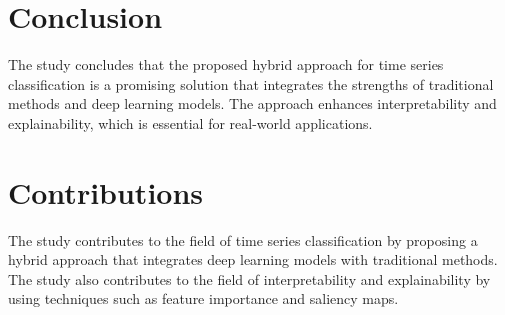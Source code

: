 \documentclass{article}
\begin{document}
\section{Conclusion}

The study concludes that the proposed hybrid approach for time series classification is a promising solution that integrates the strengths of traditional methods and deep learning models. The approach enhances interpretability and explainability, which is essential for real-world applications.

\section{Contributions}

The study contributes to the field of time series classification by proposing a hybrid approach that integrates deep learning models with traditional methods. The study also contributes to the field of interpretability and explainability by using techniques such as feature importance and saliency maps.
\end{document}
